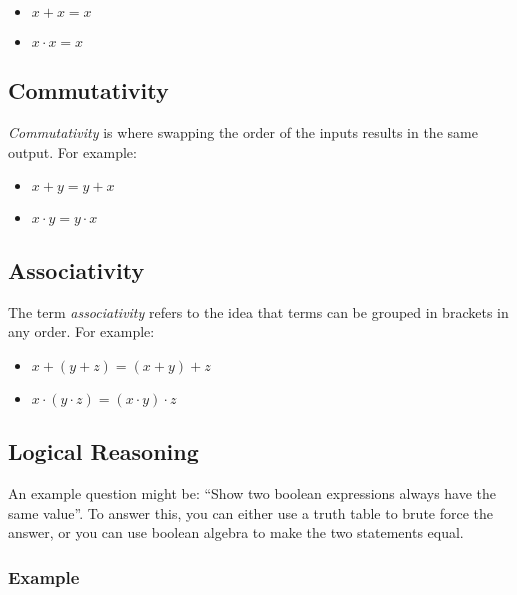 \begin{itemize}
	\item \(x + x = x\)
	\item \(x \cdot x = x\)
\end{itemize}

\subsection{Commutativity}\label{sub:commutativity}

\emph{Commutativity} is where swapping the order of the inputs results in the same output.
For example:

\begin{itemize}
	\item \(x+y=y+x\)
	\item \(x \cdot y = y \cdot x\)
\end{itemize}

\subsection{Associativity}\label{sub:associativity}

The term \emph{associativity} refers to the idea that terms can be grouped in brackets in any order.
For example:

\begin{itemize}
	\item \(x + (y + z) = (x + y) + z\)
	\item \(x \cdot (y \cdot z) = (x \cdot y) \cdot z\)
\end{itemize}

\subsection{Logical Reasoning}\label{sub:logical_reasoning}

An example question might be: ``Show two boolean expressions always have the same value''.
To answer this, you can either use a truth table to brute force the answer, or you can use boolean algebra to make the two statements equal.

\subsubsection{Example}\label{ssub:example}


